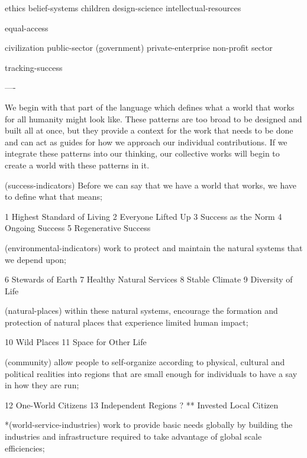 ethics
belief-systems
children
design-science
intellectual-resources

equal-access

civilization
public-sector (government)
private-enterprise
non-profit sector

tracking-success

----

We begin with that part of the language which defines what a world that works for all humanity might look like. These patterns are too broad to be designed and built all at once, but they provide a context for the work that needs to be done and can act as guides for how we approach our individual contributions. If we integrate these patterns into our thinking, our collective works will begin to create a world with these patterns in it.


(success-indicators) Before we can say that we have a world that works, we have to define what that means;

	1  Highest Standard of Living
	2  Everyone Lifted Up
	3  Success as the Norm
	4  Ongoing Success
	5  Regenerative Success

(environmental-indicators) work to protect and maintain the natural systems that we depend upon;

	6  Stewards of Earth
	7  Healthy Natural Services
	8  Stable Climate
	9  Diversity of Life

(natural-places) within these natural systems, encourage the formation and protection of natural places that experience limited human impact;

	10  Wild Places
	11  Space for Other Life

(community) allow people to self-organize according to physical, cultural and political realities into regions that are small enough for individuals to have a say in how they are run;

	12  One-World Citizens
	13  Independent Regions
?	**  Invested Local Citizen   %

*(world-service-industries) work to provide basic needs globally by building the industries and infrastructure required to take advantage of global scale efficiencies;

